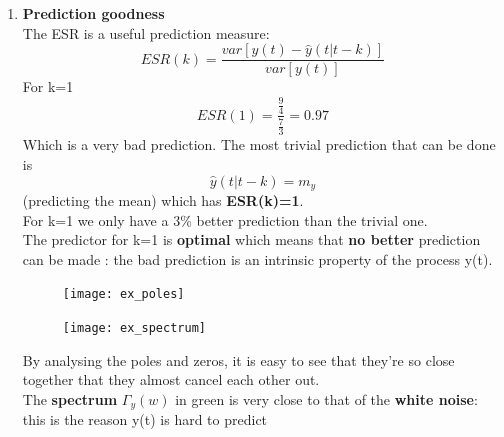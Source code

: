 \begin{enumerate}
\item \textbf{Prediction goodness}\\
The ESR is a useful prediction measure:
$$ ESR(k) = \frac{var[y(t) - \hat{y}(t|t-k)]}{var[y(t)]}$$
For k=1 $$ESR(1) = \frac{\frac{9}{4}}{\frac{7}{3}} = 0.97$$
Which is a very bad prediction. The most trivial prediction that can be done is 
$$ \hat{y}(t|t-k) = m_y$$  (predicting the mean) which has \textbf{ESR(k)=1}.\\
For k=1 we only have a 3\% better prediction than the trivial one.\\
The predictor for k=1 is \textbf{optimal} which means that \textbf{no better } prediction can be made : the bad prediction is an intrinsic property of the process y(t).\\
 
\begin{figure}[H]
\begin{minipage}{.5\textwidth}
 \centering
  \texttt{[image: ex\_poles]}
\end{minipage}%
	\begin{minipage}{.5\textwidth}
  \centering
  \texttt{[image: ex\_spectrum]}
\end{minipage}%
\end{figure}
By analysing the poles and zeros, it is easy to see that they're so close together that they almost cancel each other out.\\
The \textbf{spectrum} $\Gamma_y(w)$  in green is very close to that of the \textbf{white noise}: this is the reason y(t) is hard to predict 
\end{enumerate}


